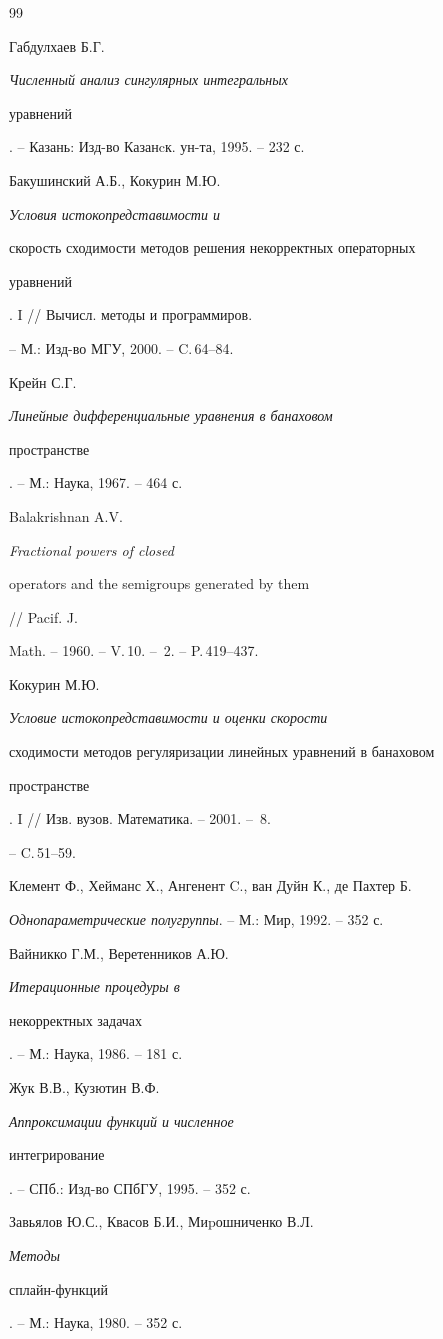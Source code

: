 \begin{thebibliography}{99}


Габдулхаев Б.Г. {\em Численный анализ сингулярных интегральных


уравнений}. -- Казань: Изд-во Казанcк. ун-та, 1995. -- 232 с.




Бакушинский А.Б., Кокурин М.Ю. {\em Условия истокопредставимости и


скорость сходимости методов решения некорректных операторных 


уравнений}. I // Вычисл. методы и программиров. 


-- М.: Изд-во МГУ, 2000. -- C.\,64--84.




Крейн С.Г. {\em Линейные дифференциальные уравнения в банаховом


пространстве}. -- М.: Наука, 1967. -- 464 с.




Balakrishnan A.V. {\em Fractional powers of closed


operators and the semigroups generated by them} // Pacif. J. 


Math. -- 1960. -- V.\,10. -- \No\,2. -- P.\,419--437.




Кокурин М.Ю. {\em Условие истокопредставимости и оценки скорости


сходимости методов регуляризации линейных уравнений в банаховом


пространстве}. I // Изв. вузов. Математика. -- 2001. -- \No\,8.


-- C.\,51--59.




Клемент Ф., Хейманс Х., Ангенент C., ван Дуйн К., де Пахтер Б.


{\em Однопараметрические полугруппы}. -- М.: Мир, 1992. -- 352 с.




Вайникко Г.М., Веретенников А.Ю. {\em Итерационные процедуры в


некорректных задачах}. -- М.: Наука, 1986. -- 181 с.




Жук В.В., Кузютин В.Ф. {\em Аппроксимации функций и численное


интегрирование}. -- СПб.: Изд-во СПбГУ, 1995. -- 352 с.




Завьялов Ю.С., Квасов Б.И., Миpошниченко В.Л. {\em Методы


сплайн-функций}. -- М.: Наука, 1980. -- 352 с.





\end{thebibliography}





\vskip 2cm












\label{end}





